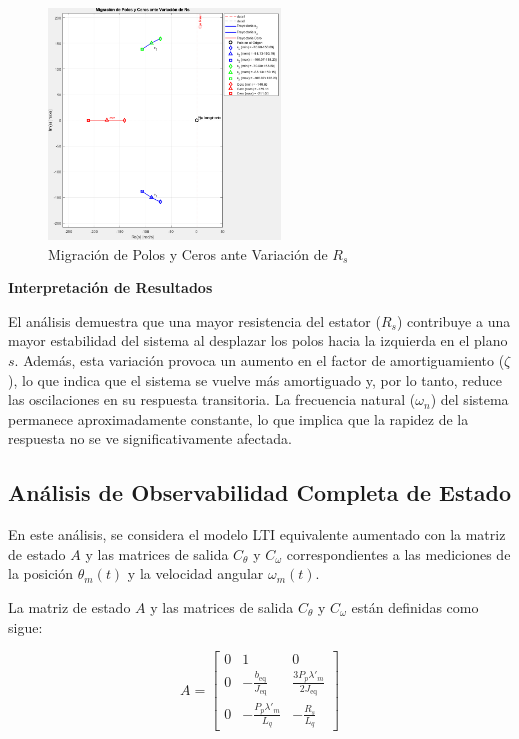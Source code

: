 \documentclass{article}
\begin{document}
\begin{figure}[H]
    \centering
    \includegraphics[width=0.55\textwidth]{Imagenes/migracion_polos_ceros.png}
    \caption{Migración de Polos y Ceros ante Variación de \( R_s \)}
    \label{fig:migracion_polos_ceros}
\end{figure}

\textbf{Interpretación de Resultados}

El análisis demuestra que una mayor resistencia del estator (\( R_s \)) contribuye a una mayor estabilidad del sistema al desplazar los polos hacia la izquierda en el plano \( s \). Además, esta variación provoca un aumento en el factor de amortiguamiento (\( \zeta \)), lo que indica que el sistema se vuelve más amortiguado y, por lo tanto, reduce las oscilaciones en su respuesta transitoria. La frecuencia natural (\( \omega_n \)) del sistema permanece aproximadamente constante, lo que implica que la rapidez de la respuesta no se ve significativamente afectada.


\subsection{Análisis de Observabilidad Completa de Estado}

En este análisis, se considera el modelo LTI equivalente aumentado con la matriz de estado \( A \) y las matrices de salida \( C_{\theta} \) y \( C_{\omega} \) correspondientes a las mediciones de la posición \(\theta_m(t)\) y la velocidad angular \(\omega_m(t)\).

La matriz de estado \( A \) y las matrices de salida \( C_{\theta} \) y \( C_{\omega} \) están definidas como sigue:

\[
A = \begin{bmatrix}
0 & 1 & 0 \\
0 & -\frac{b_{\text{eq}}}{J_{\text{eq}}} & \frac{3 P_{p} \lambda'_{m}}{2 J_{\text{eq}}} \\
0 & -\frac{P_{p} \lambda'_{m}}{L_q} & -\frac{R_s}{L_q}
\end{bmatrix}
\]
\end{document}
